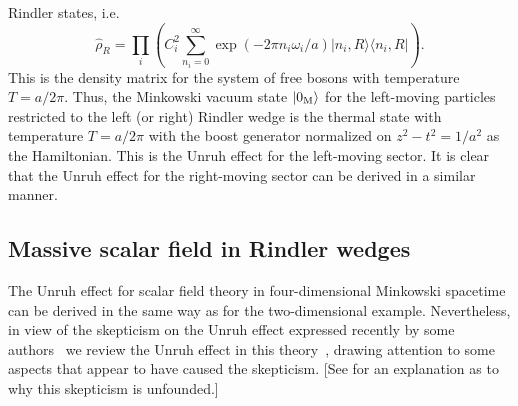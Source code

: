 \documentclass[12pt,nofootinbib,floatfix,aps,prd,showpacs,amsmath,amssymb,eqsecnum]{revtex4-2}
\begin{document}
Rindler states, i.e.
\begin{equation}
\hat{\rho}_R =  \prod_i \left( C_i^2 \sum_{n_{i}=0}^\infty \exp(-2\pi
n_{i}\omega_i/a)|n_{i},R\rangle\langle n_{i},R|
\right). \label{sec2:discdensity}
\end{equation}
This is the density matrix for the system of free bosons with
temperature $T = a/2\pi$.  Thus, the Minkowski vacuum state $|0_{\rm
M}\rangle$ for the
left-moving particles restricted to the left (or right) Rindler wedge is
the thermal state with temperature $T=a/2\pi$ with the boost
generator normalized on $z^2-t^2=1/a^2$ as the Hamiltonian. This is the
Unruh effect for the left-moving sector.  It is clear
that the Unruh effect for the right-moving sector can be derived
in a similar manner.

\subsection{Massive scalar field in Rindler wedges}
\label{section2:massive}

The Unruh effect for scalar field theory in four-dimensional Minkowski
spacetime can be derived in the same way as for the
two-dimensional example.  Nevertheless, in view of the skepticism on
the Unruh effect expressed recently by some 
authors~\cite{Belinskiietal97,Fedotovetal99,Belinskiietal02,Belinskiietal04,Oriti00}
 we review the Unruh effect in this theory~\cite{Fulling73,Unruh76}, drawing attention to
some aspects that appear to have caused the skepticism. [See
\textcite{rebuttal} for an explanation as to why this skepticism is
unfounded.]
\end{document}
